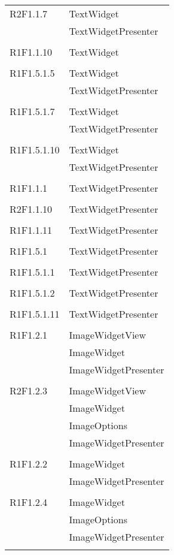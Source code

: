 \begin{center}
\begin{longtable}{|p{7cm}|p{7cm}|}
		R2F1.1.7 & TextWidget \\ & TextWidgetPresenter \\ & \\ \hline
		R1F1.1.10 & TextWidget \\ & \\ \hline
		R1F1.5.1.5 & TextWidget \\ & TextWidgetPresenter \\ & \\ \hline
		R1F1.5.1.7 & TextWidget \\ & TextWidgetPresenter \\ & \\ \hline
		R1F1.5.1.10 & TextWidget \\ & TextWidgetPresenter \\ & \\ \hline
		R1F1.1.1 & TextWidgetPresenter \\ & \\ \hline
		R2F1.1.10 & TextWidgetPresenter \\ & \\ \hline
		R1F1.1.11 & TextWidgetPresenter \\ & \\ \hline
		R1F1.5.1 & TextWidgetPresenter \\ & \\ \hline
		R1F1.5.1.1 & TextWidgetPresenter \\ & \\ \hline
		R1F1.5.1.2 & TextWidgetPresenter \\ & \\ \hline
		R1F1.5.1.11 & TextWidgetPresenter \\ & \\ \hline
		R1F1.2.1 & ImageWidgetView \\ & ImageWidget \\ & ImageWidgetPresenter \\ & \\ \hline
		R2F1.2.3 & ImageWidgetView \\ & ImageWidget \\ & ImageOptions \\ & ImageWidgetPresenter \\ & \\ \hline
		R1F1.2.2 & ImageWidget \\ & ImageWidgetPresenter \\ & \\ \hline
		R1F1.2.4 & ImageWidget \\ & ImageOptions \\ & ImageWidgetPresenter \\ & \\ \hline

\end{longtable}
\end{center}
